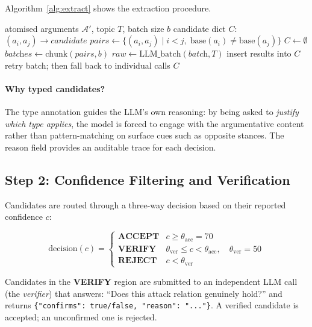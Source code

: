 \documentclass[runningheads]{llncs}
\begin{document}
Algorithm~\ref{alg:extract} shows the extraction procedure.

\begin{algorithm}[t]
\caption{Typed Attack Candidate Extraction}
\label{alg:extract}
\begin{algorithmic}[1]
\Require atomised arguments $\mathcal{A}'$, topic $T$, batch size $b$
\Ensure candidate dict $C$: $(a_i, a_j) \to \textit{candidate}$
\State $\textit{pairs} \gets \{(a_i, a_j) \mid i < j,\; \mathrm{base}(a_i) \neq \mathrm{base}(a_j)\}$
\State $C \gets \emptyset$
\State $\textit{batches} \gets \mathrm{chunk}(\textit{pairs}, b)$
  \State $\textit{raw} \gets \mathrm{LLM\_batch}(\textit{batch}, T)$
    \State insert results into $C$
  \Else
    \State retry batch; then fall back to individual calls
  \EndIf
\EndFor
\Return $C$
\end{algorithmic}
\end{algorithm}

\paragraph{Why typed candidates?} The type annotation guides the LLM's
own reasoning: by being asked to \emph{justify which type applies}, the
model is forced to engage with the argumentative content rather than
pattern-matching on surface cues such as opposite stances. The reason
field provides an auditable trace for each decision.

\subsection{Step 2: Confidence Filtering and Verification}

Candidates are routed through a three-way decision based on their
reported confidence $c$:

\begin{equation}
\text{decision}(c) = \begin{cases}
  \textbf{ACCEPT} & c \geq \theta_{\text{acc}} = 70 \\
  \textbf{VERIFY} & \theta_{\text{ver}} \leq c < \theta_{\text{acc}},
                    \quad \theta_{\text{ver}} = 50 \\
  \textbf{REJECT} & c < \theta_{\text{ver}}
\end{cases}
\end{equation}

Candidates in the \textbf{VERIFY} region are submitted to an independent
LLM call (the \emph{verifier}) that answers: ``Does this attack
relation genuinely hold?'' and returns \texttt{\{"confirms": true/false,
"reason": "..."\}}. A verified candidate is accepted; an unconfirmed
one is rejected.
\end{document}
